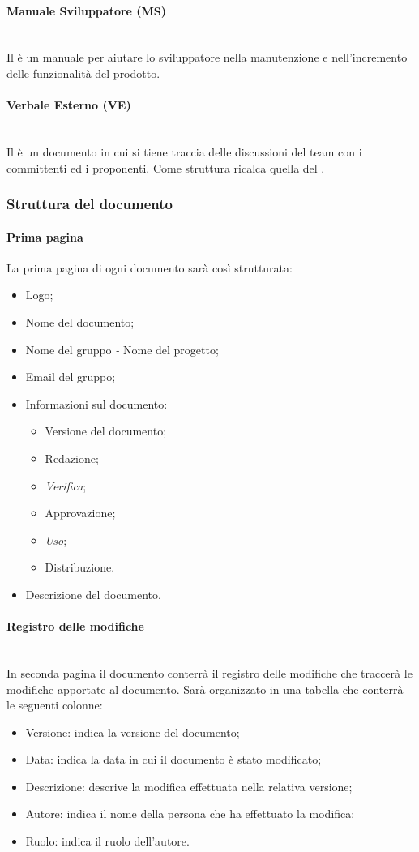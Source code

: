 	\paragraph{Manuale Sviluppatore (MS)}
	~\\Il \MS{} è un manuale per aiutare lo sviluppatore nella manutenzione e nell'incremento delle funzionalità del prodotto.
	\paragraph{Verbale Esterno (VE)}
	~\\Il \VE{} è un documento in cui si tiene traccia delle discussioni del team con i committenti ed i proponenti. Come struttura ricalca quella del \VI.
	
	\subsubsection{Struttura del documento}
	\paragraph{Prima pagina}
	La prima pagina di ogni documento sarà così strutturata:
	\begin{itemize}
		\item Logo;
		\item Nome del documento;
		\item Nome del gruppo \emph{-} Nome del progetto;
		\item Email del gruppo;
		\item Informazioni sul documento:
		\begin{itemize}
			\item Versione del documento;
			\item Redazione;
			\item \emph{Verifica};
			\item Approvazione;
			\item \emph{Uso};
			\item Distribuzione.
		\end{itemize}
		\item Descrizione del documento.
	\end{itemize}
	\paragraph{Registro delle modifiche}
	~\\In seconda pagina il documento conterrà il registro delle modifiche che traccerà le modifiche apportate al documento. Sarà organizzato in una tabella che conterrà le seguenti colonne:
	\begin{itemize}
		\item Versione:
		indica la versione del documento;
		\item Data:
		indica la data in cui il documento è stato modificato;
		\item Descrizione:
		descrive la modifica effettuata nella relativa versione;
		\item Autore:
		indica il nome della persona che ha effettuato la modifica;
		\item Ruolo:
		indica il ruolo dell'autore.
	\end{itemize}
